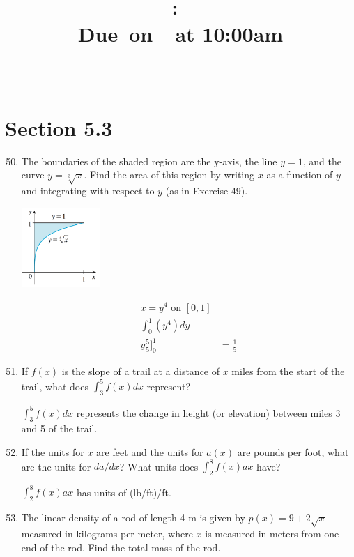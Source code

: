 \documentclass{article}
\title{
    \vspace{2in}
    \textmd{\textbf{\hmwkClass:\ \hmwkTitle}}\\
    \normalsize\vspace{0.1in}\small{Due\ on\ \hmwkDueDate\ at 10:00am}\\
    \vspace{0.1in}\large{\textit{\hmwkClassInstructor\ \hmwkClassTime}}
    \vspace{3in}
}
\author{\hmwkAuthorName}
\date{}
\begin{document}
\maketitle

\pagebreak

\section{Section 5.3}
\begin{enumerate}
\setcounter{enumi}{49}
	\item The boundaries of the shaded region are the y-axis, the line $y=1$, and the curve $y=\sqrt[3]{x}$. Find the area of this region by writing $x$ as a function of $y$ and integrating with respect to $y$ (as in Exercise 49).
	\begin{center}
		\includegraphics[width=3cm]{images/53pr50}
	\end{center}
	$$\begin{align}
		x=y^4\text{ on }[0,1]\\
		\int_0^1(y^4)dy\\
		y\frac{5}{5}\Bigg]_0^1&=\boxed{\frac{1}{5}}
	\end{align}$$
\setcounter{enumi}{55}
	\item If $f(x)$ is the slope of a trail at a distance of $x$ miles from the start of the trail, what does $\int_{3}^{5}f(x)dx$ represent?\newline
	\begin{center}
		$\int_{3}^{5}f(x)dx$ represents the change in height (or elevation) between miles 3 and 5 of the trail.
	\end{center}
\setcounter{enumi}{57}
	\item If the units for $x$ are feet and the units for $a(x)$ are pounds per foot, what are the units for $da/dx$? What units does $\int_{2}^{8}f(x)ax$ have?\newline
	\begin{center}
		$\int_{2}^{8}f(x)ax$ has units of (lb/ft)/ft.
	\end{center}
\setcounter{enumi}{62}
	\item The linear density of a rod of length 4 m is given by $p(x)=9+2\sqrt{x}$ measured in kilograms per meter, where $x$ is measured in meters from one end of the rod. Find the total mass of the rod.

\end{enumerate}
\end{document}
